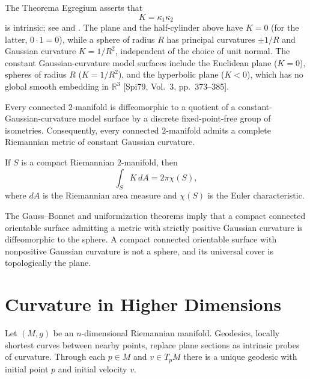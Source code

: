 The Theorema Egregium asserts that
\[
K=\kappa_1\kappa_2
\]
is intrinsic; see \cite{Gau65} and \cite[Vol.~2]{Spi79}. The plane and the half-cylinder above have
$K=0$ (for the latter, $0\cdot1=0$), while a sphere of radius $R$ has principal curvatures
$\pm1/R$ and Gaussian curvature $K=1/R^2$, independent of the choice of unit normal. The constant
Gaussian-curvature model surfaces include the Euclidean plane ($K=0$), spheres of radius $R$
($K=1/R^2$), and the hyperbolic plane ($K<0$), which has no global smooth embedding in $\mathbb R^3$
[Spi79, Vol.~3, pp.~373--385].

\begin{theorem}
\label{thm:uniformization-theorem}


Every connected $2$-manifold is diffeomorphic to a quotient of a constant-Gaussian-curvature model
surface by a discrete fixed-point-free group of isometries. Consequently, every connected
$2$-manifold admits a complete Riemannian metric of constant Gaussian curvature.
\end{theorem}

\begin{theorem}
\label{thm:gauss-bonnet-theorem-preview}


If $S$ is a compact Riemannian $2$-manifold, then
\[
\int_S K\,dA=2\pi\chi(S),
\]
where $dA$ is the Riemannian area measure and $\chi(S)$ is the Euler characteristic.
\end{theorem}

The Gauss--Bonnet and uniformization theorems imply that a compact connected orientable surface
admitting a metric with strictly positive Gaussian curvature is diffeomorphic to the sphere. A compact
connected orientable surface with nonpositive Gaussian curvature is not a sphere, and its universal
cover is topologically the plane.

\section{Curvature in Higher Dimensions}

Let $(M,g)$ be an $n$-dimensional Riemannian manifold. Geodesics, locally shortest curves between
nearby points, replace plane sections as intrinsic probes of curvature. Through each $p\in M$ and
$v\in T_pM$ there is a unique geodesic with initial point $p$ and initial velocity $v$.

